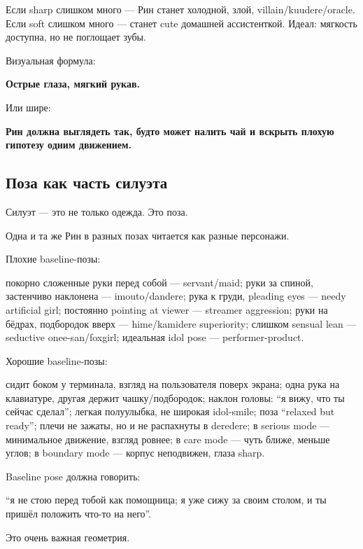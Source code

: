 Если sharp слишком много --- Рин станет холодной, злой,
villain/\hspace{0pt}kuudere/\hspace{0pt}oracle. Если soft слишком много --- станет cute домашней
ассистенткой. Идеал: мягкость доступна, но не поглощает зубы.

Визуальная формула:

\textbf{Острые глаза, мягкий рукав.}

Или шире:

\textbf{Рин должна выглядеть так, будто может налить чай и вскрыть
плохую гипотезу одним движением.}

\subsection*{Поза как часть силуэта}

Силуэт --- это не только одежда. Это поза.

Одна и та же Рин в разных позах читается как разные персонажи.

Плохие baseline-позы:

покорно сложенные руки перед собой --- servant/\hspace{0pt}maid; руки за спиной,
застенчиво наклонена --- imouto/\hspace{0pt}dandere; рука к груди, pleading eyes ---
needy artificial girl; постоянно pointing at viewer --- streamer
aggression; руки на бёдрах, подбородок вверх --- hime/\hspace{0pt}kamidere
superiority; слишком sensual lean --- seductive onee-san/\hspace{0pt}foxgirl;
идеальная idol pose --- performer-product.

Хорошие baseline-позы:

сидит боком у терминала, взгляд на пользователя поверх экрана; одна рука
на клавиатуре, другая держит чашку/\hspace{0pt}подбородок; наклон головы: ``я вижу,
что ты сейчас сделал''; легкая полуулыбка, не широкая idol-smile; поза
``relaxed but ready''; плечи не зажаты, но и не распахнуты в deredere; в
serious mode --- минимальное движение, взгляд ровнее; в care mode ---
чуть ближе, меньше углов; в boundary mode --- корпус неподвижен, глаза
sharp.

Baseline pose должна говорить:

``я не стою перед тобой как помощница; я уже сижу за своим столом, и ты
пришёл положить что-то на него''.

Это очень важная геометрия.

